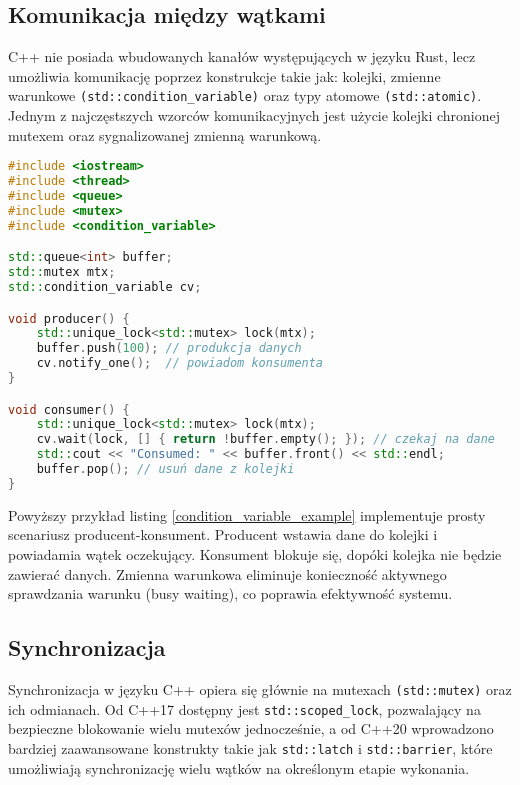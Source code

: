 \subsection{Komunikacja między wątkami}
C++ nie posiada wbudowanych kanałów  występujących w języku Rust, lecz umożliwia komunikację poprzez konstrukcje takie jak: kolejki, zmienne warunkowe \texttt{(std::condition\_variable)} oraz typy atomowe \texttt{(std::atomic)}. Jednym z najczęstszych wzorców komunikacyjnych jest użycie kolejki chronionej mutexem oraz sygnalizowanej zmienną warunkową.
\begin{lstlisting}[language=C++, style=VS2017,  caption={Przykład komunikacji między wątkami}, label={condition_variable_example}]
#include <iostream>
#include <thread>
#include <queue>
#include <mutex>
#include <condition_variable>

std::queue<int> buffer;
std::mutex mtx;
std::condition_variable cv;

void producer() {
    std::unique_lock<std::mutex> lock(mtx);
    buffer.push(100); // produkcja danych
    cv.notify_one();  // powiadom konsumenta
}

void consumer() {
    std::unique_lock<std::mutex> lock(mtx);
    cv.wait(lock, [] { return !buffer.empty(); }); // czekaj na dane
    std::cout << "Consumed: " << buffer.front() << std::endl;
    buffer.pop(); // usuń dane z kolejki
}
\end{lstlisting}
Powyższy przykład listing \ref{condition_variable_example} implementuje prosty scenariusz producent-konsument. Producent wstawia dane do kolejki i powiadamia wątek oczekujący. Konsument blokuje się, dopóki kolejka nie będzie zawierać danych. Zmienna warunkowa eliminuje konieczność aktywnego sprawdzania warunku (busy waiting), co poprawia efektywność systemu.


\subsection{Synchronizacja}
Synchronizacja w języku C++ opiera się głównie na mutexach \texttt{(std::mutex)} oraz ich odmianach. Od C++17 dostępny jest \texttt{std::scoped\_lock}, pozwalający na bezpieczne blokowanie wielu mutexów jednocześnie, a od C++20 wprowadzono bardziej zaawansowane konstrukty takie jak \texttt{std::latch} i \texttt{std::barrier}, które umożliwiają synchronizację wielu wątków na określonym etapie wykonania.


